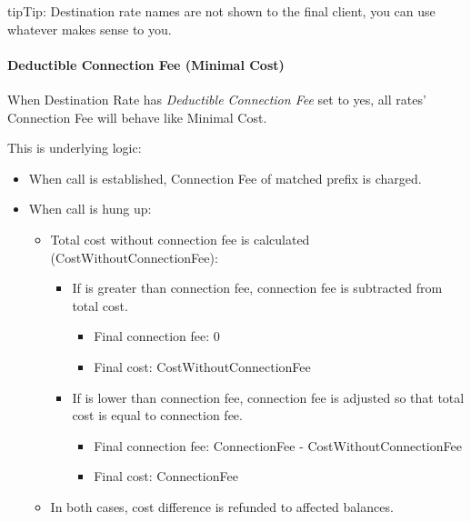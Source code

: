 \documentclass[letterpaper,10pt,english]{sphinxmanual}
\begin{document}
\begin{notice}{tip}{Tip:}
Destination rate names are not shown to the final client, you can use whatever makes sense to you.
\end{notice}


\paragraph{Deductible Connection Fee (Minimal Cost)}
\label{administration_portal/brand/billing/destination_rates:deductible-connection-fee-minimal-cost}
When Destination Rate has \emph{Deductible Connection Fee} set to yes, all rates' Connection Fee will behave like Minimal Cost.

This is underlying logic:
\begin{itemize}
\item {} 
When call is established, Connection Fee of matched prefix is charged.

\item {} 
When call is hung up:
\begin{itemize}
\item {} 
Total cost without connection fee is calculated (CostWithoutConnectionFee):
\begin{itemize}
\item {} 
If is greater than connection fee, connection fee is subtracted from total cost.
\begin{itemize}
\item {} 
Final connection fee: 0

\item {} 
Final cost: CostWithoutConnectionFee

\end{itemize}

\item {} 
If is lower than connection fee, connection fee is adjusted so that total cost is equal to connection fee.
\begin{itemize}
\item {} 
Final connection fee: ConnectionFee - CostWithoutConnectionFee

\item {} 
Final cost: ConnectionFee

\end{itemize}

\end{itemize}

\item {} 
In both cases, cost difference is refunded to affected balances.

\end{itemize}

\end{itemize}
\end{document}
